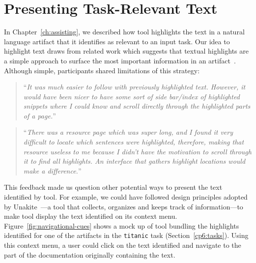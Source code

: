 




\section{Presenting Task-Relevant Text}
\label{cp7:info-viz}




In Chapter~\ref{ch:assisting}, we described how \acs{tool}
highlights the text in a natural language artifact that it identifies 
as relevant to an input task. Our idea to highlight text 
draws from related work which suggests that textual highlights 
are a simple approach to surface the most important information in 
an artifact~\cite{Robillard2015,nadi2020}. 
Although simple, participants shared limitations of 
this strategy:



\smallskip
\begin{quote}
``\textit{It was much easier to follow with previously highlighted text.  
    However, it would have been nicer to have some sort of side bar/index of highlighted snippets
    where I could know and scroll directly through the highlighted parts of a page.}''
\end{quote}



\smallskip
\begin{quote}
``\textit{There was a resource page which was super long, and I found it very difficult to locate which sentences were highlighted, therefore, making that resource useless to me because I didn't have the motivation to scroll through it to find all highlights. An interface that gathers highlight locations would make a difference.}''
\end{quote}


\smallskip
This feedback made us question other potential ways to present the text identified by \acs{tool}.
For example, we could have followed design principles adopted by Unakite~\cite{Liu2018Unakite}---a tool that collects, organizes and keeps track of information---to make \acs{tool} display the text identified on its context menu.
Figure~\ref{fig:navigational-cues} shows a mock up of \acs{tool} bundling the highlights identified for one of the artifacts in the \texttt{titanic} task (Section~\ref{cp6:tasks}).
Using this context menu, a user could click on the text identified and navigate to the part of the documentation 
originally containing the text.



